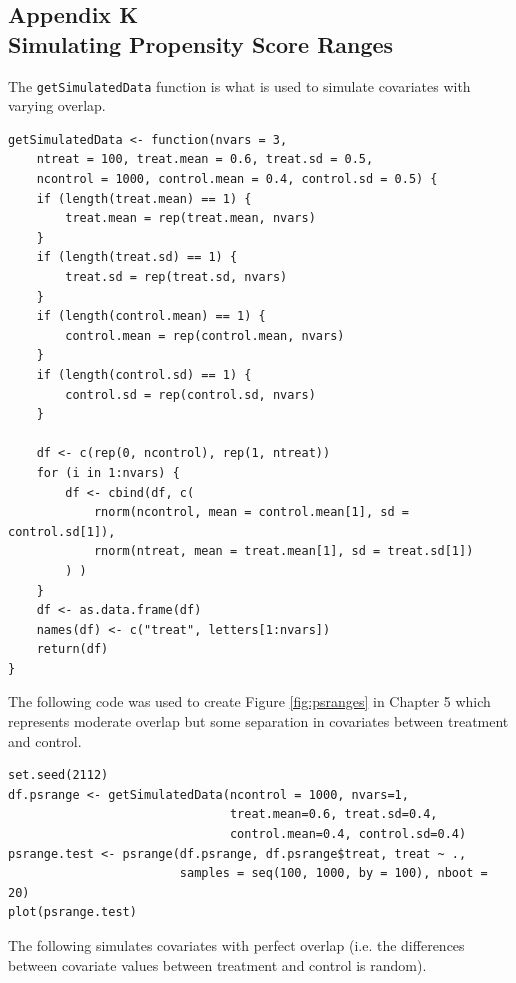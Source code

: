 \clearpage
{}
\subsection*{Appendix K\\Simulating Propensity Score Ranges}

\begin{singlespace}

\noindent The \texttt{getSimulatedData} function is what is used to simulate covariates with varying overlap.

\begin{verbatim}
getSimulatedData <- function(nvars = 3, 
    ntreat = 100, treat.mean = 0.6, treat.sd = 0.5, 
    ncontrol = 1000, control.mean = 0.4, control.sd = 0.5) {
    if (length(treat.mean) == 1) {
        treat.mean = rep(treat.mean, nvars)
    }
    if (length(treat.sd) == 1) {
        treat.sd = rep(treat.sd, nvars)
    }
    if (length(control.mean) == 1) {
        control.mean = rep(control.mean, nvars)
    }
    if (length(control.sd) == 1) {
        control.sd = rep(control.sd, nvars)
    }
    
    df <- c(rep(0, ncontrol), rep(1, ntreat))
    for (i in 1:nvars) {
        df <- cbind(df, c(
            rnorm(ncontrol, mean = control.mean[1], sd = control.sd[1]), 
            rnorm(ntreat, mean = treat.mean[1], sd = treat.sd[1])
        ) )
    }
    df <- as.data.frame(df)
    names(df) <- c("treat", letters[1:nvars])
    return(df)
}
\end{verbatim}

\noindent The following code was used to create Figure \ref{fig:psranges} in Chapter 5 which represents moderate overlap but some separation in covariates between treatment and control.


\begin{verbatim}
set.seed(2112)
df.psrange <- getSimulatedData(ncontrol = 1000, nvars=1,
                               treat.mean=0.6, treat.sd=0.4,
                               control.mean=0.4, control.sd=0.4)
psrange.test <- psrange(df.psrange, df.psrange$treat, treat ~ ., 
                        samples = seq(100, 1000, by = 100), nboot = 20)
plot(psrange.test)
\end{verbatim}

\noindent The following simulates covariates with perfect overlap (i.e. the differences between covariate values between treatment and control is random).


\end{singlespace}

